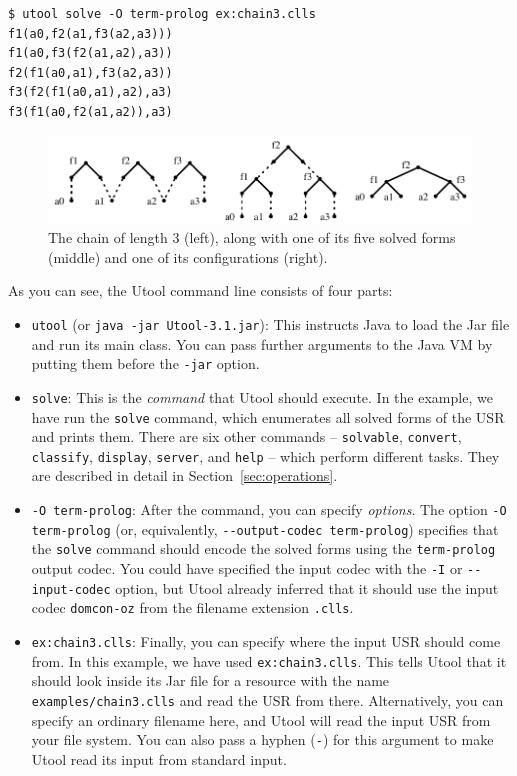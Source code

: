 \begin{verbatim}
$ utool solve -O term-prolog ex:chain3.clls
f1(a0,f2(a1,f3(a2,a3)))
f1(a0,f3(f2(a1,a2),a3))
f2(f1(a0,a1),f3(a2,a3))
f3(f2(f1(a0,a1),a2),a3)
f3(f1(a0,f2(a1,a2)),a3)
\end{verbatim}


\begin{figure}
\centering
\includegraphics{chain.pdf}
\caption{The chain of length 3 (left), along with one of its five
solved forms (middle) and one of its configurations (right).
\label{fig:chain3}}
\end{figure}


As you can see, the Utool command line consists of four parts:
\begin{itemize}
\item \verb?utool? (or \verb?java -jar Utool-3.1.jar?): This instructs
Java to load the Jar file and run its main class. You can pass further
arguments to the Java VM by putting them before the \verb?-jar?
option.

\item \verb?solve?: This is the \emph{command} that Utool should execute. In the example, we have run the \verb?solve? command, which enumerates all solved forms of the USR and prints them. There are six other commands --
\verb?solvable?, \verb?convert?, \verb?classify?,
\verb?display?, \verb?server?, and \verb?help? -- which perform
different tasks. They are described in detail in Section~\ref{sec:operations}.

\item \verb?-O term-prolog?: After the command, you can specify \emph{options}. The option \verb?-O term-prolog? (or, equivalently, \verb?--output-codec term-prolog?) specifies that the \verb?solve? command should encode the solved forms using the \verb?term-prolog? output codec. You could have specified the input codec with the \verb?-I? or \verb?--input-codec? option, but Utool already inferred that it should use the input codec \verb?domcon-oz? from the filename extension \verb?.clls?.

\item \verb?ex:chain3.clls?: Finally, you can specify where the input USR should come from. In this example, we have used \verb?ex:chain3.clls?. This tells Utool that it should look inside its Jar file for a resource with the name \verb?examples/chain3.clls? and read the USR from there. Alternatively, you can specify an ordinary filename here, and Utool will read the input USR from your file system. You can also pass a hyphen (\verb?-?) for this argument to make Utool read its input from standard input.
\end{itemize}


